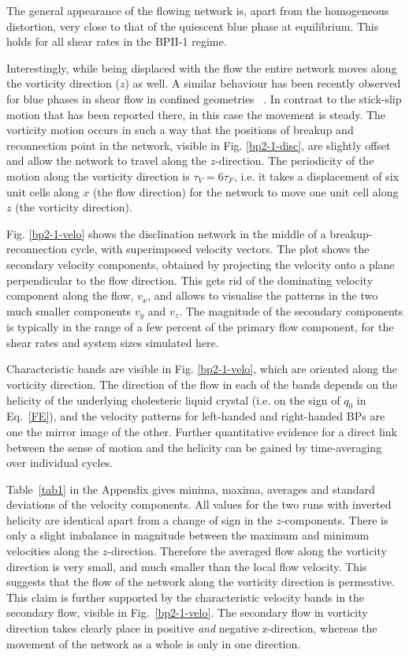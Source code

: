 \documentclass[8.5pt,twoside,twocolumn]{article}
\begin{document}
The general appearance of the flowing network is, apart from the homogeneous distortion,
very close to that of the quiescent blue phase at equilibrium. This holds for all
shear rates in the BPII-1 regime.

Interestingly, while being displaced with the flow the entire network moves 
along the vorticity direction ($z$) as well.  A similar behaviour has been recently 
observed for blue phases in shear flow in confined geometries ~\cite{Henrich:2012b}.
In contrast to the stick-slip motion that has been reported there,
in this case the movement is steady. 
The vorticity motion occurs in such a way that the positions of breakup and reconnection 
point in the network, visible in Fig. \ref{bp2-1-disc}, are slightly offset and allow the network 
to travel along the $z$-direction. The periodicity of the motion along the vorticity direction
is $\tau_V=6\tau_F$, 
i.e. it takes a displacement of six unit cells along $x$ (the flow direction) 
for the network to move one unit cell along $z$ (the vorticity direction).

Fig. \ref{bp2-1-velo} shows the disclination network in the middle of a breakup-reconnection
cycle, with superimposed velocity vectors.
The plot shows the secondary velocity components, obtained by projecting the
velocity onto a plane perpendicular to the flow direction.
This gets rid of the dominating velocity component along the flow, $v_x$, and 
allows to visualise the patterns in the 
two much smaller components $v_y$ and $v_z$.
The magnitude of the secondary components is typically in the range of a 
few percent of the primary flow component, for the shear rates 
and system sizes simulated here.

Characteristic bands are visible in Fig. \ref{bp2-1-velo}, which are 
oriented along the vorticity direction. The direction of the flow
in each of the bands depends on the helicity of the underlying cholesteric
liquid crystal (i.e. on the sign of $q_0$ in Eq.~\ref{FE}), and the velocity
patterns for left-handed and right-handed BPs are one the mirror image of
the other. 
Further quantitative evidence for a direct link between the sense of motion 
and the helicity can be gained by time-averaging over individual cycles.

Table~\ref{tab1} in the Appendix 
gives minima, maxima, averages and standard deviations 
of the velocity components.
All values for the two runs with inverted helicity are identical apart 
from a change of sign in the $z$-components.
There is only a slight imbalance in magnitude 
between the maximum and minimum velocities 
along the $z$-direction. 
Therefore the averaged flow along the vorticity
direction is very small, and much smaller than
the local flow velocity. This suggests that the
flow of the network along the vorticity 
direction is permeative. This claim is further supported by the characteristic 
velocity bands in the secondary flow, visible in Fig.~\ref{bp2-1-velo}. 
The secondary flow in vorticity direction takes clearly place in positive {\em and} 
negative z-direction, whereas the movement of the network as a whole is only in one direction.
\end{document}

